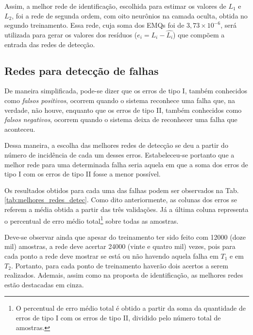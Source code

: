 Assim, a melhor rede de identificação, escolhida para estimar os valores de
$L_1$ e $L_2$, foi a rede de segunda ordem, com oito neurônios na camada oculta,
obtida no segundo treinamento. Essa rede, cuja soma dos EMQs foi de $3,73 \times
10^{-6}$, será utilizada para gerar os valores dos resíduos ($e_i = L_i -
\widehat{L_i}$) que compõem a entrada das redes de detecção.

\subsection{Redes para detecção de falhas}
De maneira simplificada, pode-se dizer que os erros de tipo I, também conhecidos
como {\it falsos positivos}, ocorrem quando o sistema reconhece uma falha que,
na verdade, não houve, enquanto que os erros de tipo II, também conhecidos como
{\it falsos negativos}, ocorrem quando o sistema deixa de reconhecer uma falha
que aconteceu.

Dessa maneira, a escolha das melhores redes de detecção se deu a partir do
número de incidência de cada um desses erros. Estabeleceu-se portanto que a
melhor rede para uma determinada falha seria aquela em que a soma dos erros de
tipo I com os erros de tipo II fosse a menor possível.

Os resultados obtidos para cada uma das falhas podem ser observados na Tab.
\ref{tab:melhores_redes_detec}. Como dito anteriormente, as colunas dos erros se
referem a média obtida a partir das três validações. Já a última coluna
representa o percentual de erro médio total\footnote{O percentual de erro médio
total é obtido a partir da soma da quantidade de erros de tipo I com os erros de
tipo II, dividido pelo número total de amostras.} sobre todas as amostras. 

Deve-se observar ainda que apesar do treinamento ter sido feito com 12000 (doze
mil) amostras, a rede deve acertar 24000 (vinte e quatro mil) vezes, pois para
cada ponto a rede deve mostrar se está ou não havendo aquela falha em $T_1$ e em
$T_2$. Portanto, para cada ponto de treinamento haverão dois acertos a serem
realizados. Ademais, assim como na proposta de identificação, as melhores redes
estão destacadas em cinza.

